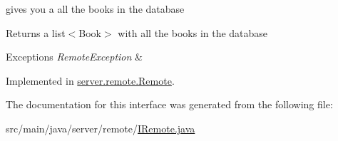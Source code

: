 gives you a all the books in the database \begin{DoxyReturn}{Returns}
a list$<$\+Book$>$ with all the books in the database 
\end{DoxyReturn}

\begin{DoxyExceptions}{Exceptions}
{\em Remote\+Exception} & \\
\hline
\end{DoxyExceptions}


Implemented in \hyperlink{classserver_1_1remote_1_1_remote_a131873c01bc4fe829dd7d2385c89ca87}{server.\+remote.\+Remote}.



The documentation for this interface was generated from the following file\+:\begin{DoxyCompactItemize}
\item 
src/main/java/server/remote/\hyperlink{_i_remote_8java}{I\+Remote.\+java}\end{DoxyCompactItemize}
